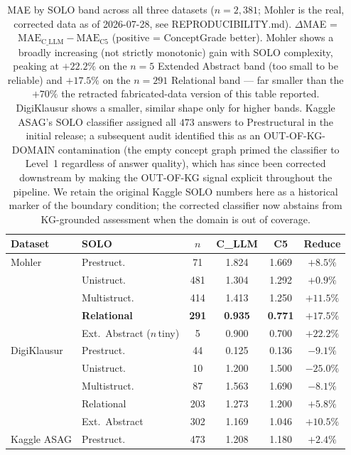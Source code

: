 \documentclass[conference]{IEEEtran}
\begin{document}
\begin{table}[t]
\caption{MAE by SOLO band across all three datasets ($n=2{,}381$; Mohler
         is the real, corrected data as of 2026-07-28, see
         REPRODUCIBILITY.md).
         $\Delta$MAE = $\text{MAE}_{\text{C\_LLM}} - \text{MAE}_{\text{C5}}$ (positive
         = ConceptGrade better). Mohler shows a broadly increasing (not
         strictly monotonic) gain with SOLO complexity, peaking at
         $+22.2\%$ on the $n=5$ Extended Abstract band (too small to be
         reliable) and $+17.5\%$ on the $n=291$ Relational band --- far
         smaller than the $+70\%$ the retracted fabricated-data version of
         this table reported.
         DigiKlausur shows a smaller, similar shape only for higher bands.
         Kaggle ASAG's SOLO classifier assigned all $473$ answers to
         Prestructural in the initial release; a subsequent audit identified
         this as an OUT-OF-KG-DOMAIN contamination (the empty concept graph
         primed the classifier to Level~1 regardless of answer quality), which
         has since been corrected downstream by making the OUT-OF-KG signal
         explicit throughout the pipeline. We retain the original Kaggle SOLO
         numbers here as a historical marker of the boundary condition; the
         corrected classifier now abstains from KG-grounded assessment when
         the domain is out of coverage.}
\label{tab:solo_analysis}
\centering
\footnotesize
\setlength{\tabcolsep}{4pt}
\begin{tabular}{llcccc}
\toprule
\textbf{Dataset} & \textbf{SOLO} & \textbf{$n$} &
\textbf{C\_LLM} & \textbf{C5} & \textbf{Reduce} \\
\midrule
Mohler     & Prestruct.    &  71 & 1.824 & 1.669 & $+8.5\%$ \\
           & Unistruct.    & 481 & 1.304 & 1.292 & $+0.9\%$ \\
           & Multistruct.  & 414 & 1.413 & 1.250 & $+11.5\%$ \\
           & \textbf{Relational} & \textbf{291} & \textbf{0.935} & \textbf{0.771} & \textbf{$+17.5\%$} \\
           & Ext.\ Abstract ($n$\,tiny) & 5 & 0.900 & 0.700 & $+22.2\%$ \\
\midrule
DigiKlausur & Prestruct.   &  44 & 0.125 & 0.136 & $-9.1\%$ \\
           & Unistruct.    &  10 & 1.200 & 1.500 & $-25.0\%$ \\
           & Multistruct.  &  87 & 1.563 & 1.690 & $-8.1\%$ \\
           & Relational    & 203 & 1.273 & 1.200 & $+5.8\%$ \\
           & Ext.\ Abstract & 302 & 1.169 & 1.046 & $+10.5\%$ \\
\midrule
Kaggle ASAG & Prestruct.   & 473 & 1.208 & 1.180 & $+2.4\%$ \\
\bottomrule
\end{tabular}
\end{table}
\end{document}
